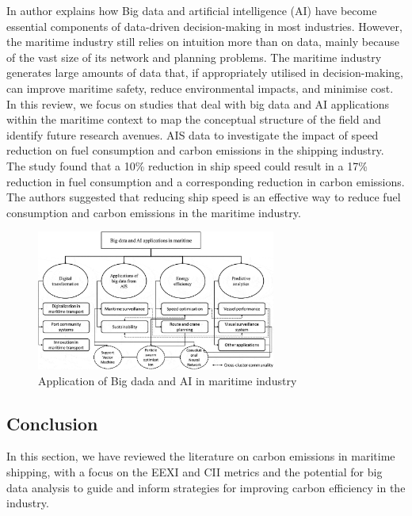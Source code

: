 In \cite{doi:10.1080/03088839.2020.1788731} author explains how Big data and artificial intelligence (AI) have become essential components of data-driven decision-making in most industries.
However, the maritime industry still relies on intuition more than on data, mainly because of the vast size of its network and planning problems.
The maritime industry generates large amounts of data that, if appropriately utilised in decision-making, can improve maritime safety, reduce environmental impacts, and minimise cost. In this review, we focus on studies that deal with big data and AI applications within the maritime context to map the conceptual structure of the field and identify future research avenues.
AIS data to investigate the impact of speed reduction on fuel consumption and carbon emissions in the shipping industry.
The study found that a 10\% reduction in ship speed could result in a 17\% reduction in fuel consumption and a corresponding reduction in carbon emissions.
The authors suggested that reducing ship speed is an effective way to reduce fuel consumption and carbon emissions in the maritime industry.

\begin{figure}[h]
    \centering
    \includegraphics[width=0.7\textwidth]{images/application_big_data_martime.jpeg}
    \caption{Application of Big dada and AI in maritime industry}
    \label{applicationBigDataMartime}
\end{figure}

\subsection{Conclusion}

In this section, we have reviewed the literature on carbon emissions in maritime shipping, with a focus on the EEXI and CII metrics and the potential for big data analysis to guide and inform strategies for improving carbon efficiency in the industry.

